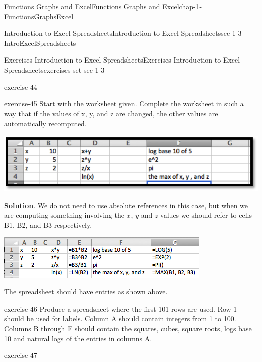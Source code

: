 \documentclass[oneside,10pt,]{book}
\numberwithin{equation}{section}
\begin{document}
\begin{chapterptx}{Functions Graphs and Excel}{}{Functions Graphs and Excel}{}{}{chap-1-FunctionsGraphsExcel}
\begin{sectionptx}{Introduction to Excel Spreadsheets}{}{Introduction to Excel Spreadsheets}{}{}{sec-1-3-IntroExcelSpreadsheets}
\begin{exercises-subsection-numberless}{Exercises Introduction to Excel Spreadsheets}{}{Exercises Introduction to Excel Spreadsheets}{}{}{exercises-set-sec-1-3}
\begin{divisionexercise}{2}{}{}{exercise-44}
\end{divisionexercise}%
\begin{divisionexercise}{3}{}{}{exercise-45}%
\hypertarget{p-286}{}%
Start with the worksheet given.  Complete the worksheet in such a way that if the values of x, y, and z are changed, the other values are automatically recomputed. \leavevmode%
\begin{sidebyside}{1}{0.1}{0.1}{0}%
\begin{sbspanel}{0.8}%
\includegraphics[width=1\linewidth]{images/sec1-3-e1.png}
\end{sbspanel}%
\end{sidebyside}%
%
\par\smallskip%
\noindent\textbf{Solution}.\hypertarget{solution-23}{}\quad%
\hypertarget{p-287}{}%
We do not need to use absolute references in this case, but when we are computing something involving the \(x\), \(y\) and \(z\) values we should refer to cells B1, B2, and B3 respectively.%
\begin{sidebyside}{1}{0.1}{0.1}{0}%
\begin{sbspanel}{0.8}%
\includegraphics[width=1\linewidth]{images/sec1-3-sol3b.png}
\end{sbspanel}%
\end{sidebyside}%
\par
\hypertarget{p-288}{}%
The spreadsheet should have entries as shown above.%
\end{divisionexercise}%
\begin{divisionexercise}{4}{}{}{exercise-46}%
\hypertarget{p-289}{}%
Produce a spreadsheet where the first 101 rows are used.  Row 1 should be used for labels. Column A should contain integers from 1 to 100.  Columns B through F should contain the squares, cubes, square roots, logs base 10 and natural logs of the entries in columns A.%
\end{divisionexercise}%
\begin{divisionexercise}{5}{}{}{exercise-47}%

\end{divisionexercise}
\end{exercises-subsection-numberless}
\end{sectionptx}
\end{chapterptx}
\end{document}
